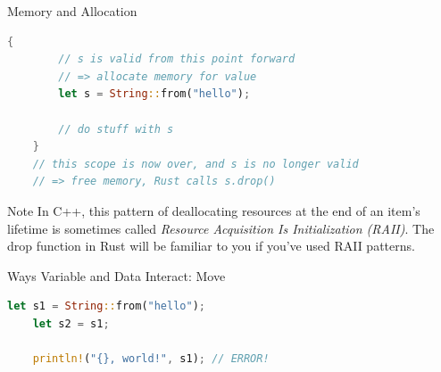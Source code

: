 \begin{Frame}[fragile]{Memory and Allocation}
  \begin{lstlisting}[language=Rust,gobble=4]
    {
        // s is valid from this point forward
        // => allocate memory for value
        let s = String::from("hello"); 

        // do stuff with s
    }
    // this scope is now over, and s is no longer valid
    // => free memory, Rust calls s.drop()
  \end{lstlisting}

  \begin{block}{Note}
    In C++, this pattern of deallocating resources at the end of
    an item's lifetime is sometimes called \emph{Resource Acquisition
    Is Initialization (RAII)}. The drop function in Rust will be
    familiar to you if you've used RAII patterns.
  \end{block}
\end{Frame}

\begin{Frame}[fragile,t]{Ways Variable and Data Interact: Move}
  \begin{lstlisting}[language=Rust,gobble=4]
    let s1 = String::from("hello");
    let s2 = s1;

    println!("{}, world!", s1); // ERROR!
  \end{lstlisting}

  \hskip3cm
\end{Frame}

